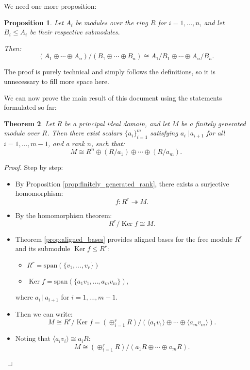 \documentclass{article}
\newif\ifusemulticols
\theoremstyle{definition}
\theoremstyle{remark}
\theoremstyle{plain}
\newtheorem{theorem}{Theorem}
\theoremstyle{plain}
\newtheorem{prop}[theorem]{Proposition}
\newenvironment{mymulticols}
    { \ifusemulticols \begin{multicols}{2} \fi }
    { \ifusemulticols \end{multicols} \fi }
\DeclareMathOperator{\Ker}{Ker}
\begin{document}
\begin{mymulticols}
We need one more proposition:
\begin{prop}
    Let $A_i$ be modules over the ring $R$ for $i = 1, \ldots, n$, and let $B_i \le A_i$ be their
    respective submodules.

    Then:
    $$(A_1 \oplus \cdots \oplus A_n) / (B_1 \oplus \cdots \oplus B_n) \cong A_1 / B_1 \oplus \cdots \oplus A_n / B_n.$$
\end{prop}

The proof is purely technical and simply follows the definitions, so it is unnecessary to fill more
space here.

We can now prove the main result of this document using the statements formulated so far:

\begin{theorem}
    Let $R$ be a principal ideal domain, and let $M$ be a finitely generated module over $R$. Then
    there exist scalars $\{a_i\}_{i=1}^m$ satisfying $a_i \,|\, a_{i+1}$ for all $i = 1, \ldots,
    m-1$, and a rank $n$, such that: $$M \cong R^n \oplus (R / a_1) \oplus \cdots \oplus (R / a_m).$$
\end{theorem}
\begin{proof}
    Step by step:
    \begin{itemize}
        \item By Proposition \ref{prop:finitely_generated_rank}, there exists a surjective homomorphism: $$f : R^r \twoheadrightarrow M.$$
        \item By the homomorphism theorem: $$R^r / \Ker f \cong M.$$
        \item Theorem \ref{prop:aligned_bases} provides aligned bases for the free module $R^r$ and
            its submodule $\Ker f \le R^r$:
            \begin{itemize}
                \item $R^r = \text{span}(\{v_1, \ldots, v_r\})$
                \item $\Ker f = \text{span}(\{a_1 v_1, \ldots, a_m v_m\})$,
            \end{itemize}
            where $a_i \,|\, a_{i+1}$ for $i = 1, \ldots, m-1$.

        \item Then we can write:
            $$M \cong R^r / \Ker f = \left(\oplus_{i=1}^r R\right) / \left(\langle a_1 v_1 \rangle \oplus \cdots \oplus \langle a_m v_m \rangle\right).$$

        \item Noting that $\langle a_i v_i \rangle \cong a_i R$:
            $$M \cong (\oplus_{i=1}^r R) / (a_1 R \oplus \cdots \oplus a_m R).$$


\end{itemize}
\end{proof}
\end{mymulticols}
\end{document}
